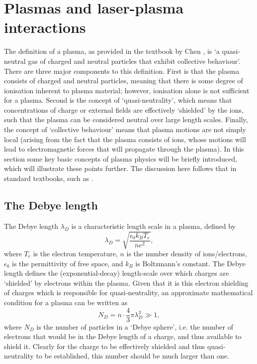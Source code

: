 \section{Plasmas and laser-plasma interactions}
The definition of a plasma, as provided in the textbook by Chen \cite{Chen2016}, is `a quasi-neutral gas of charged and neutral particles that exhibit collective behaviour'. There are three major components to this definition. First is that the plasma consists of charged and neutral particles, meaning that there is some degree of ionisation inherent to plasma material; however, ionisation alone is not sufficient for a plasma. Second is the concept of `quasi-neutrality', which means that concentrations of charge or external fields are effectively `shielded' by the ions, such that the plasma can be considered neutral over large length scales. Finally, the concept of `collective behaviour' means that plasma motions are not simply local (arising from the fact that the plasma consists of ions, whose motions will lead to electromagnetic forces that will propagate through the plasma). In this section some key basic concepts of plasma physics will be briefly introduced, which will illustrate these points further. The discussion here follows that in standard textbooks, such as \cite{Chen2016}.

\subsection{The Debye length}
The Debye length $\lambda_D$ is a characteristic length scale in a plasma, defined by
\begin{equation} \lambda_D = \sqrt{ \frac{\epsilon_0 k_B T_e}{n e^2}}, \end{equation}
where $T_e$ is the electron temperature, $n$ is the number density of ions/electrons, $\epsilon_0$ is the permittivity of free space, and $k_B$ is Boltzmann's constant. The Debye length defines the (exponential-decay) length-scale over which charges are `shielded' by electrons within the plasma. Given that it is this electron shielding of charges which is responsible for quasi-neutrality, an approximate mathematical condition for a plasma can be written as 
\begin{equation} N_D = n \cdot \frac{4}{3} \pi \lambda_D^3 \gg 1, \end{equation}
where $N_D$ is the number of particles in a `Debye sphere', i.e. the number of electrons that would be in the Debye length of a charge, and thus available to shield it. Clearly for the charge to be effectively shielded and thus quasi-neutrality to be established, this number should be much larger than one.


